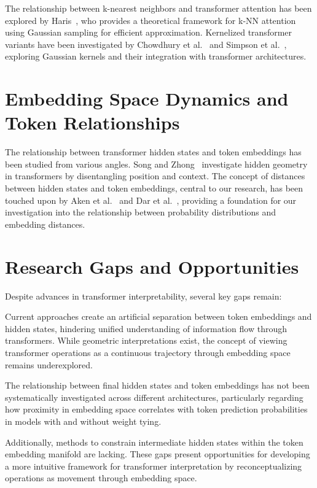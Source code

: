 The relationship between k-nearest neighbors and transformer attention has been explored by Haris~\cite{haris2024knn}, who provides a theoretical framework for k-NN attention using Gaussian sampling for efficient approximation. Kernelized transformer variants have been investigated by Chowdhury et al.~\cite{chowdhury2021learning} and Simpson et al.~\cite{simpson2021kernel}, exploring Gaussian kernels and their integration with transformer architectures.

\section{Embedding Space Dynamics and Token Relationships}

The relationship between transformer hidden states and token embeddings has been studied from various angles. Song and Zhong~\cite{song2023uncovering} investigate hidden geometry in transformers by disentangling position and context. The concept of distances between hidden states and token embeddings, central to our research, has been touched upon by Aken et al.~\cite{aken2020visbert} and Dar et al.~\cite{dar2022analyzing}, providing a foundation for our investigation into the relationship between probability distributions and embedding distances.

\section{Research Gaps and Opportunities}

Despite advances in transformer interpretability, several key gaps remain:

Current approaches create an artificial separation between token embeddings and hidden states, hindering unified understanding of information flow through transformers. While geometric interpretations exist, the concept of viewing transformer operations as a continuous trajectory through embedding space remains underexplored.

The relationship between final hidden states and token embeddings has not been systematically investigated across different architectures, particularly regarding how proximity in embedding space correlates with token prediction probabilities in models with and without weight tying.

Additionally, methods to constrain intermediate hidden states within the token embedding manifold are lacking. These gaps present opportunities for developing a more intuitive framework for transformer interpretation by reconceptualizing operations as movement through embedding space.
